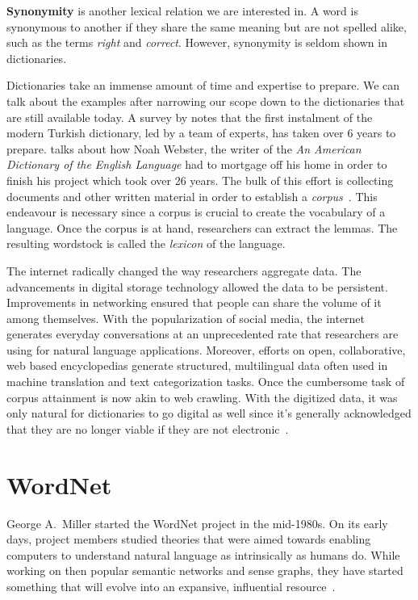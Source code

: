 \textbf{Synonymity} is another lexical relation we are interested in.
A word is synonymous to another if they share the same meaning but are not spelled alike, such as the terms \emph{right} and \emph{correct}.
However, synonymity is seldom shown in dictionaries.

Dictionaries take an immense amount of time and expertise to prepare.
We can talk about the examples after narrowing our scope down to the dictionaries that are still available today.
A survey by \textcite{uzun_1945ten_1999} notes that the first instalment of the modern Turkish dictionary, led by a team of experts, has taken over 6 years to prepare.
\textcite{kendall_forgotten_2011} talks about how Noah Webster, the writer of the \emph{An American Dictionary of the English Language} had to mortgage off his home in order to finish his project which took over 26 years.
The bulk of this effort is collecting documents and other written material in order to establish a \emph{corpus}~\cite{uzun_1945ten_1999}.
This endeavour is necessary since a corpus is crucial to create the vocabulary of a language.
Once the corpus is at hand, researchers can extract the lemmas.
The resulting wordstock is called the \emph{lexicon} of the language.

The internet radically changed the way researchers aggregate data.
The advancements in digital storage technology allowed the data to be persistent.
Improvements in networking ensured that people can share the volume of it among themselves.
With the popularization of social media, the internet generates everyday conversations at an unprecedented rate that researchers are using for natural language applications.
Moreover,  efforts on open, collaborative, web based encyclopedias generate structured, multilingual data often used in machine translation and text categorization tasks.
Once the cumbersome task of corpus attainment is now akin to web crawling.
With the digitized data, it was only natural for dictionaries to go digital as well since it's generally acknowledged that they are no longer viable if they are not electronic~\cite{sterkenburg_practical_2003}.

\section{WordNet}%
\label{sec:wordnet}
George A.\ Miller started the WordNet project in the mid-1980s.
On its early days, project members studied theories that were aimed towards enabling computers to understand natural language as intrinsically as humans do.
While working on then popular semantic networks and sense graphs, they have started something that will evolve into an expansive, influential resource~\cite{fellbaum_wordnet_1998}.

